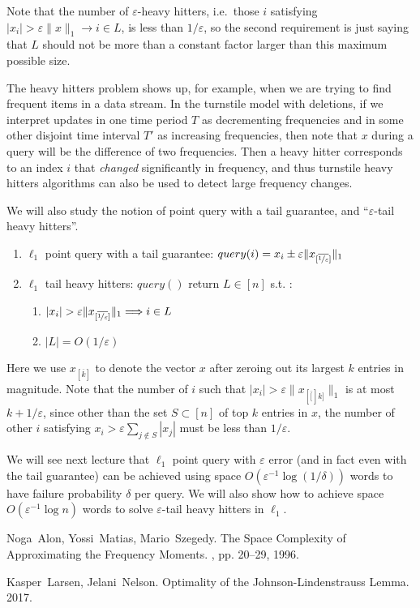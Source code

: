 \documentclass[11pt]{article}
\newcommand{\eps}{\varepsilon}
\newcommand{\proj}[1]{[\overline{#1}]}
\newcommand{\projeps}{{\proj{\nicefrac[]{1}{\eps}}}}
\begin{document}
Note that the number of $\eps$-heavy hitters, i.e.\ those $i$ satisfying $|x_i| > \eps \|x\|_1 \rightarrow i \in L$, is less than $1/\eps$, so the second requirement is just saying that $L$ should not be more than a constant factor larger than this maximum possible size.

The heavy hitters problem shows up, for example, when we are trying to find frequent items in a data stream. In the turnstile model with deletions, if we interpret updates in one time period $T$ as decrementing frequencies and in some other disjoint time interval $T'$ as increasing frequencies, then note that $x$ during a query will be the difference of two frequencies. Then a heavy hitter corresponds to an index $i$ that {\em changed} significantly in frequency, and thus turnstile heavy hitters algorithms can also be used to detect large frequency changes.

We will also study the notion of point query with a tail guarantee, and ``$\eps$-tail heavy hitters''.

\begin{enumerate}
	\item $\ell_1$ point query with a tail guarantee: $query(i) = x_i \pm \eps \|x_\projeps\|_1$ 
    \item $\ell_1$ tail heavy hitters: $query()$ return $L \in [n]$ s.t. :
    	\begin{enumerate}
        	\item $|x_i| > \eps \|x_\projeps\|_1 \Longrightarrow i \in L$
            \item $|L| = O(1/\eps)$
        \end{enumerate}
\end{enumerate}
Here we use $x_{\proj{k}}$ to denote the vector $x$ after zeroing out its largest $k$ entries in magnitude. Note that the number of $i$ such that $|x_i| > \eps \|x_{\proj[k]}\|_1$ is at most $k + 1/\eps$, since other than the set $S\subset[n]$ of top $k$ entries in $x$, the number of other $i$ satisfying $x_i > \eps\sum_{j\notin S} |x_j|$ must be less than $1/\eps$.

We will see next lecture that $\ell_1$ point query with $\eps$ error (and in fact even with the tail guarantee) can be achieved using space $O(\eps^{-1}\log(1/\delta))$ words to have failure probability $\delta$ per query. We will also show how to achieve space $O(\eps^{-1}\log n)$ words to solve $\eps$-tail heavy hitters in $\ell_1$.



\begin{thebibliography}{42}


Noga~Alon, Yossi~Matias, Mario~Szegedy.
\newblock The Space Complexity of Approximating the Frequency Moments.
, pp. 20--29, 1996.

    Kasper~Larsen, Jelani~Nelson.
    \newblock Optimality of the Johnson-Lindenstrauss Lemma.
     2017.

\end{thebibliography}
\end{document}
